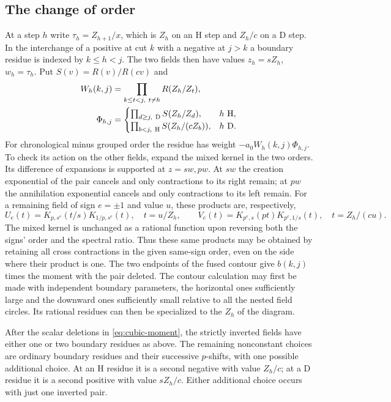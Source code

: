 \subsection{The change of order}
At a step $h$ write $\tau_h=Z_{h+1}/x$, which is $Z_h$ on an H step
and $Z_h/c$ on a D step. In the interchange of a positive at cut $k$
with a negative at $j>k$ a boundary residue is indexed by $k\le h<j$.
The two fields then have values $z_h=s Z_h$, $w_h=\tau_h$. Put
$S(v)=R(v)/R(cv)$ and
\[
 \begin{split}
 W_h(k,j)&=\prod_{k\le t<j,\ t\ne h} R(Z_h/Z_t),\\
 \Phi_{h,j}&=
 \begin{cases}
 \prod_{d\ge j,\ {\rm D}} S(Z_h/Z_d),&h\ {\rm H},\\
 \prod_{b<j,\ {\rm H}} S(Z_h/(cZ_b)),&h\ {\rm D}.
 \end{cases}
 \end{split}
\]
For chronological minus grouped order the residue has weight
$-a_0W_h(k,j)\Phi_{h,j}$. To check its action on the other fields,
expand the mixed kernel in the two orders. Its difference of expansions
is supported at $z=sw,pw$. At $sw$ the creation exponential of the
pair cancels and only contractions to its right remain; at $pw$ the
annihilation exponential cancels and only contractions to its left
remain. For a remaining field of sign $e=\pm1$ and value $u$, these
products are, respectively,
\[
 U_e(t)=K_{p,s^e}(t/s)K_{1/p,s^e}(t),\quad t=u/Z_h,\qquad
 V_e(t)=K_{p^e,s}(pt)K_{p^e,1/s}(t),\quad t=Z_h/(cu).
\]
The mixed kernel is unchanged as a rational function upon reversing
both the signs' order and the spectral ratio. Thus these same
products may be obtained by retaining all cross contractions in the
given same-sign order, even on the side where their product is one.
The two endpoints of the fused contour give $b(k,j)$ times the
moment with the pair deleted. The contour calculation may first be made
with independent boundary parameters, the horizontal ones sufficiently
large and the downward ones sufficiently small relative to all the
nested field circles. Its rational residues can then be specialized
to the $Z_h$ of the diagram.

\begin{lemma}\label{lem:cubic-poles}
After the scalar deletions in \eqref{eq:cubic-moment}, the strictly
inverted fields have either one or two boundary residues as above.
The remaining nonconstant choices are ordinary boundary residues and
their successive $p$-shifts, with one possible additional choice. At
an H residue it is a second negative with value $Z_h/c$; at a D
residue it is a second positive with value $sZ_h/c$. Either additional
choice occurs with just one inverted pair.
\end{lemma}

